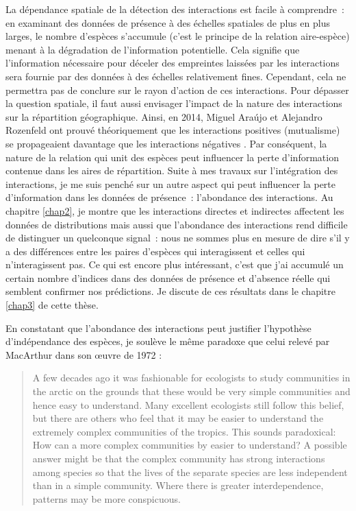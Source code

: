 La dépendance spatiale de la détection des interactions est facile à
comprendre~: en examinant des données de présence à des échelles
spatiales de plus en plus larges, le nombre d'espèces s'accumule (c'est
le principe de la relation aire-espèce) menant à la dégradation de
l'information potentielle. Cela signifie que l'information nécessaire
pour déceler des empreintes laissées par les interactions sera fournie
par des données à des échelles relativement fines. Cependant, cela ne
permettra pas de conclure sur le rayon d'action de ces interactions.
Pour dépasser la question spatiale, il faut aussi envisager l'impact de
la nature des interactions sur la répartition géographique. Ainsi, en
2014, Miguel Araújo et Alejandro Rozenfeld ont prouvé théoriquement que
les interactions positives (mutualisme) se propageaient davantage que
les interactions négatives \citep{Araujo2014}. Par conséquent, la nature
de la relation qui unit des espèces peut influencer la perte
d'information contenue dans les aires de répartition. Suite à mes
travaux sur l'intégration des interactions, je me suis penché sur un
autre aspect qui peut influencer la perte d'information dans les données
de présence~: l'abondance des interactions. Au chapitre \ref{chap2}, je
montre que les interactions directes et indirectes affectent les données
de distributions mais aussi que l'abondance des interactions rend
difficile de distinguer un quelconque signal~: nous ne sommes plus en
mesure de dire s'il y a des différences entre les paires d'espèces qui
interagissent et celles qui n'interagissent pas. Ce qui est encore plus
intéressant, c'est que j'ai accumulé un certain nombre d'indices dans
des données de présence et d'absence réelle qui semblent confirmer nos
prédictions. Je discute de ces résultats dans le chapitre \ref{chap3} de
cette thèse.

En constatant que l'abondance des interactions peut justifier
l'hypothèse d'indépendance des espèces, je soulève le même paradoxe que
celui relevé par MacArthur dans son œuvre de 1972
\citep{macarthur1972geographical} :

\begin{quote}
A few decades ago it was fashionable for ecologists to study communities
in the arctic on the grounds that these would be very simple communities
and hence easy to understand. Many excellent ecologists still follow
this belief, but there are others who feel that it may be easier to
understand the extremely complex communities of the tropics. This sounds
paradoxical: How can a more complex communities by easier to understand?
A possible answer might be that the complex community has strong
interactions among species so that the lives of the separate species are
less independent than in a simple community. Where there is greater
interdependence, patterns may be more conspicuous.
\end{quote}

